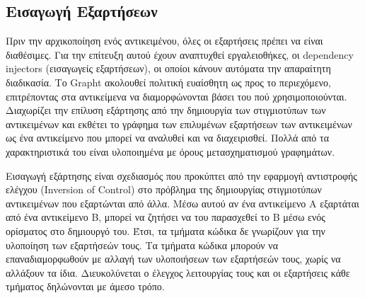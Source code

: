 \subsection{Εισαγωγή Εξαρτήσεων}
Πριν την αρχικοποίηση ενός αντικειμένου, όλες οι εξαρτήσεις πρέπει να είναι διαθέσιμες. Για την επίτευξη αυτού έχουν αναπτυχθεί εργαλειοθήκες, οι {\en dependency injectors} (εισαγωγείς εξαρτήσεων), οι οποίοι κάνουν αυτόματα την απαραίτητη διαδικασία. Το {\en Grapht} ακολουθεί πολιτική ευαίσθητη ως προς το περιεχόμενο, επιτρέποντας στα αντικείμενα να διαμορφώνονται βάσει του πού χρησιμοποιούνται. Διαχωρίζει την επίλυση εξάρτησης από την δημιουργία των στιγμιοτύπων των αντικειμένων και εκθέτει το γράφημα των επιλυμένων εξαρτήσεων των αντικειμένων ως ένα αντικείμενο που μπορεί να αναλυθεί και να διαχειρισθεί. Πολλά από τα χαρακτηριστικά του είναι υλοποιημένα με όρους μετασχηματισμού γραφημάτων. \par
Εισαγωγή εξάρτησης είναι σχεδιασμός που προκύπτει από την εφαρμογή αντιστροφής ελέγχου {\en (Inversion of Control)} στο πρόβλημα της δημιουργίας στιγμιοτύπων αντικειμένων που εξαρτώνται από άλλα. Μέσω αυτού αν ένα αντικείμενο Α εξαρτάται από ένα αντικείμενο Β, μπορεί να ζητήσει να του παρασχεθεί το Β μέσω ενός ορίσματος στο δημιουργό του. Έτσι, τα τμήματα κώδικα δε γνωρίζουν για την υλοποίηση των εξαρτήσεών τους. Τα τμήματα κώδικα μπορούν να επαναδιαμορφωθούν με αλλαγή των υλοποιήσεων των εξαρτήσεών τους, χωρίς να αλλάξουν τα ίδια. Διευκολύνεται ο έλεγχος λειτουργίας τους και οι εξαρτήσεις κάθε τμήματος δηλώνονται με άμεσο τρόπο. 